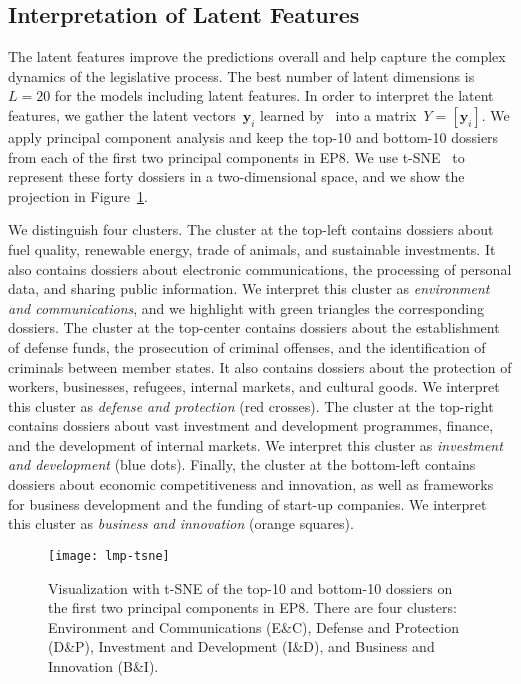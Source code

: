 \subsection{Interpretation of Latent Features}

The latent features improve the predictions overall and help capture the complex dynamics of the legislative process.
The best number of latent dimensions is~$L = 20$  for the models including latent features.
In order to interpret the latent features, we gather the latent vectors~$\bm{y}_i$ learned by \ into a matrix~$Y = [ \bm{y}_i ]$.
We apply principal component analysis and keep the top-10 and bottom-10 dossiers from each of the first two principal components in EP8.
We use t-SNE~\cite{maaten2008visualizing} to represent these forty dossiers in a two-dimensional space, and we show the projection in Figure~\ref{lmp:fig:tsne}.

We distinguish four clusters.
The cluster at the top-left contains dossiers about fuel quality, renewable energy, trade of animals, and sustainable investments.
It also contains dossiers about electronic communications, the processing of personal data, and sharing public information.
We interpret this cluster as \textit{environment and communications}, and we highlight with green triangles the corresponding dossiers.
The cluster at the top-center contains dossiers about the establishment of defense funds, the prosecution of criminal offenses, and the identification of criminals between member states.
It also contains dossiers about the protection of workers, businesses, refugees, internal markets, and cultural goods.
We interpret this cluster as \textit{defense and protection} (red crosses).
The cluster at the top-right contains dossiers about vast investment and development programmes, finance, and the development of internal markets.
We interpret this cluster as \textit{investment and development} (blue dots).
Finally, the cluster at the bottom-left contains dossiers about economic competitiveness and innovation, as well as frameworks for business development and the funding of start-up companies.
We interpret this cluster as \textit{business and innovation} (orange squares).

\begin{figure}
	\centering
	\texttt{[image: lmp-tsne]}
	\caption{Visualization with t-SNE of the top-10 and bottom-10 dossiers on the first two principal components in EP8.
		There are four clusters:
		Environment and Communications (E\&C), Defense and Protection (D\&P), Investment and Development (I\&D), and Business and Innovation (B\&I).
	}
	\label{lmp:fig:tsne}
\end{figure}

